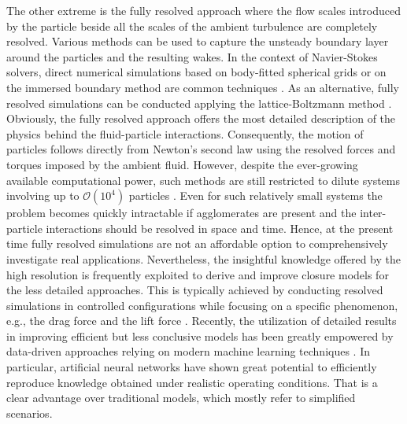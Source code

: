 The other extreme is the fully resolved approach where the flow scales
introduced by the particle beside all the scales of the ambient
turbulence are completely resolved. Various methods can be used to
capture the unsteady boundary layer around the particles and the
resulting wakes. In the context of Navier-Stokes solvers, direct
numerical simulations based on body-fitted spherical grids or on the
immersed boundary method are common techniques
\citep{burton2005fully,uhlmann2008,vreman2016particle,vowinckel2019consolidation,vowinckel2019settling,uhlmann2005}.
As an alternative, fully resolved simulations can be conducted
applying the lattice-Boltzmann method
\citep{cui2018application,jebakumar2019fully,dietzel2016application}.
Obviously, the fully resolved approach offers the most detailed
description of the physics behind the fluid-particle interactions.
Consequently, the motion of particles follows directly from Newton's
second law using the resolved forces and torques imposed by the
ambient fluid.  However, despite the ever-growing available
computational power, such methods are still restricted to dilute
systems involving up to $\mathcal{O} (10^4)$ particles
\citep[e.g.,][]{de2019assessment,picano2015turbulent,jain2021impact,uhlmann2017clustering,vowinckel2014fluid,kempe2014relevance,kempe2012collision}.
Even for such relatively small systems the problem becomes quickly
intractable if agglomerates are present and the inter-particle
interactions should be resolved in space and time. Hence, at the
present time fully resolved simulations are not an affordable option
to comprehensively investigate real applications.  Nevertheless, the
insightful knowledge offered by the high resolution is frequently
exploited to derive and improve closure models for the less detailed
approaches. This is typically achieved by conducting resolved
simulations in controlled configurations while focusing on a specific
phenomenon, e.g., the drag force and the lift force
\citep[e.g.,][]{beetstra2007drag,bogner2015drag,
  yali2015new,akiki2020shear,kurose99,bagchi2002shear,holzer2009lattice,dietzel2016application}.
Recently, the utilization of detailed results in improving efficient
but less conclusive models has been greatly empowered by data-driven
approaches relying on modern machine learning techniques
\citep{montans2019data,duraisamy2019turbulence,beck2019deep,balachandar2020towards}.
In particular, artificial neural networks have shown great potential
to efficiently reproduce knowledge obtained under realistic operating
conditions. That is a clear advantage over traditional models, which
mostly refer to simplified scenarios. \newline

